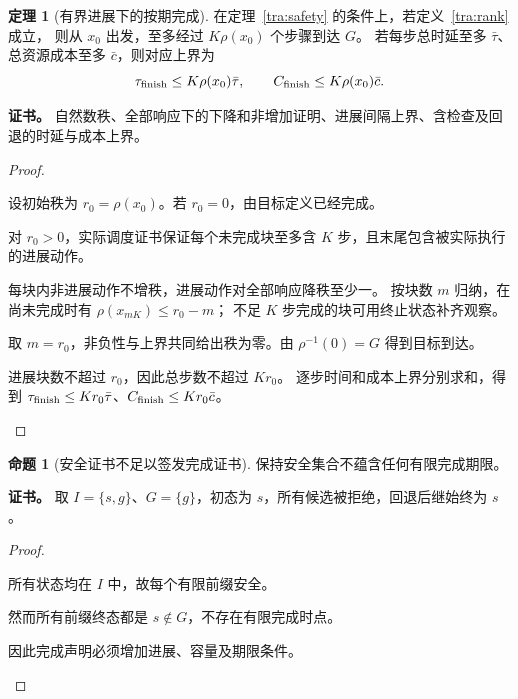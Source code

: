 \documentclass[UTF8,12pt,a4paper,openany,fontset=none,zihao=false]{ctexrep}
\theoremstyle{definition}
\newtheorem{theorem}{定理}[chapter]
\newtheorem{proposition}{命题}[chapter]
\newenvironment{certificate}{\par\noindent\textbf{证书。}\ignorespaces}{\par}
\newcommand{\1}{\mathbf 1}
\begin{document}
\begin{theorem}[有界进展下的按期完成]
\label{tra:liveness}
在定理~\ref{tra:safety} 的条件上，若定义~\ref{tra:rank} 成立，
则从 \(x_0\) 出发，至多经过 \(K\rho(x_0)\) 个步骤到达 \(G\)。
若每步总时延至多 \(\bar\tau\)、总资源成本至多 \(\bar c\)，则对应上界为
\[
\tau_{\rm finish}\le K\rho(x_0)\bar\tau,
\qquad C_{\rm finish}\le K\rho(x_0)\bar c.
\]
\end{theorem}
\begin{certificate}
自然数秩、全部响应下的下降和非增加证明、进展间隔上界、含检查及回退的时延与成本上界。
\end{certificate}
\begin{proof}
\begin{semanticsteps}
\item 设初始秩为 \(r_0=\rho(x_0)\)。若 \(r_0=0\)，由目标定义已经完成。
\item 对 \(r_0>0\)，实际调度证书保证每个未完成块至多含 \(K\) 步，且末尾包含被实际执行的进展动作。
\item 每块内非进展动作不增秩，进展动作对全部响应降秩至少一。
按块数 \(m\) 归纳，在尚未完成时有 \(\rho(x_{mK})\le r_0-m\)；
不足 \(K\) 步完成的块可用终止状态补齐观察。
\item 取 \(m=r_0\)，非负性与上界共同给出秩为零。由 \(\rho^{-1}(0)=G\) 得到目标到达。
\item 进展块数不超过 \(r_0\)，因此总步数不超过 \(Kr_0\)。
逐步时间和成本上界分别求和，得到
\(\tau_{\rm finish}\le Kr_0\bar\tau\)、\(C_{\rm finish}\le Kr_0\bar c\)。
\end{semanticsteps}
\end{proof}

\begin{proposition}[安全证书不足以签发完成证书]
\label{tra:safety-not-progress}
保持安全集合不蕴含任何有限完成期限。
\end{proposition}
\begin{certificate}
取 \(I=\{s,g\}\)、\(G=\{g\}\)，初态为 \(s\)，所有候选被拒绝，回退后继始终为 \(s\)。
\end{certificate}
\begin{proof}
\begin{semanticsteps}
\item 所有状态均在 \(I\) 中，故每个有限前缀安全。
\item 然而所有前缀终态都是 \(s\notin G\)，不存在有限完成时点。
\item 因此完成声明必须增加进展、容量及期限条件。
\end{semanticsteps}
\end{proof}
\end{document}
